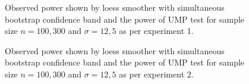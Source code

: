 \documentclass{article}
\begin{document}
\begin{figure}[hbtp]
   \centering
       \caption{Observed power shown by loess smoother with simultaneous bootstrap confidence band and the power of UMP test for sample size $n= 100,300$ and $\sigma = 12,5$ as per experiment 1.}
       \label{fig:power_loess1}
\end{figure}


\begin{figure}[hbtp]
   \centering
       \caption{Observed power shown by loess smoother with simultaneous bootstrap confidence band and the power of UMP test for sample size $n= 100,300$ and $\sigma = 12,5$ as per experiment 2.}
       \label{fig:power_loess2}
\end{figure}
\end{document}
